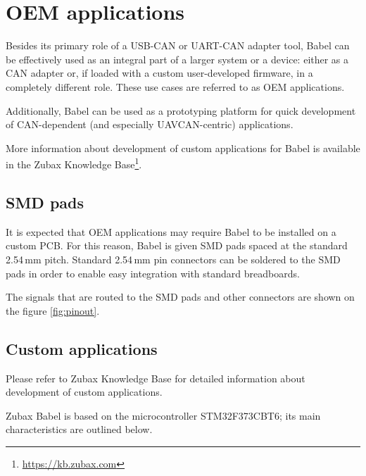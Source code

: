\documentclass{zubaxdoc}
\begin{document}
\chapter{OEM applications}\label{sec:oem_applications}

Besides its primary role of a USB-CAN or UART-CAN adapter tool,
Babel can be effectively used as an integral part of a larger system or a device:
either as a CAN adapter or, if loaded with a custom user-developed firmware,
in a completely different role.
These use cases are referred to as OEM applications.

Additionally, Babel can be used as a prototyping platform for quick development of CAN-dependent
(and especially UAVCAN-centric) applications.

More information about development of custom applications for Babel is available in the
Zubax Knowledge Base\footnote{\url{https://kb.zubax.com}}.

\section{SMD pads}

It is expected that OEM applications may require Babel to be installed on a custom PCB.
For this reason, Babel is given SMD pads spaced at the standard 2.54\,mm pitch.
Standard 2.54\,mm pin connectors can be soldered to the SMD pads in order to enable easy integration
with standard breadboards.

The signals that are routed to the SMD pads and other connectors are shown on the figure \ref{fig:pinout}.

\section{Custom applications}

Please refer to Zubax Knowledge Base for detailed information about development of custom applications.

Zubax Babel is based on the microcontroller STM32F373CBT6; its main characteristics are outlined below.
\end{document}
